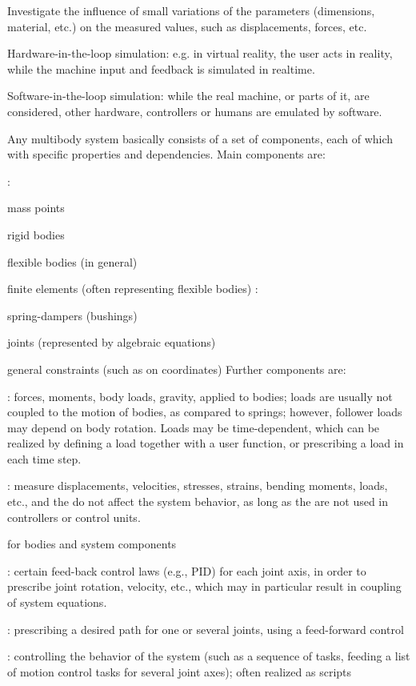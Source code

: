\noindent {}
\bi
  \item Investigate the influence of small variations of the parameters (dimensions, material, etc.) on the measured values, such as displacements, forces, etc.
\ei  

\noindent {}
\bi
  \item Hardware-in-the-loop simulation: e.g. in virtual reality, the user acts in reality, while the machine input and feedback is simulated in realtime.
  \item Software-in-the-loop simulation: while the real machine, or parts of it, are considered, other hardware, controllers or humans are emulated by software.
\ei


%
Any multibody system basically consists of a set of components, each of which with specific properties and dependencies. Main components are: \vspace{0.5cm}

\noindent {}: 
\bi
  \item mass points
  \item rigid bodies
  \item flexible bodies (in general)
  \item finite elements (often representing flexible bodies)
\ei
\noindent {}: 
\bi
  \item spring-dampers (bushings)
  \item joints (represented by algebraic equations)
  \item general constraints (such as on coordinates)
\ei
Further components are:
\bi
  \item {}: forces, moments, body loads, gravity, applied to bodies; loads are usually not coupled to the motion of bodies, as compared to springs; however, follower loads may depend on body rotation. Loads may be time-dependent, which can be realized by defining a load together with a user function, or prescribing a load in each time step.
  \item {}: measure displacements, velocities, stresses, strains, bending moments, loads, etc., and the do not affect the system behavior, as long as the are not used in controllers or control units.
  \item {} for bodies and system components
  \item {}: certain feed-back control laws (e.g., PID) for each joint axis, in order to prescribe joint rotation, velocity, etc., which may in particular result in coupling of system equations.
  \item {}: prescribing a desired path for one or several joints, using a feed-forward control
  \item {}: controlling the behavior of the system (such as a sequence of tasks, feeding a list of motion control tasks for several joint axes); often realized as scripts
\ei

